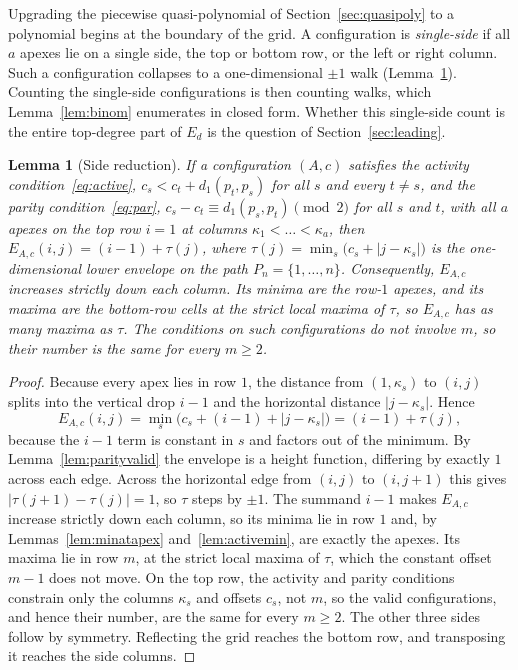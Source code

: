 \documentclass[11pt]{article}
\newtheorem{lemma}[theorem]{Lemma}
\theoremstyle{definition}
\theoremstyle{remark}
\newcommand{\dgrid}{d_1}
\begin{document}
Upgrading the piecewise quasi-polynomial of Section~\ref{sec:quasipoly} to a
polynomial begins at the boundary of the grid. A configuration is
\emph{single-side} if all $a$ apexes lie on a single side, the top or bottom
row, or the left or right column. Such a configuration collapses to a one-dimensional
$\pm1$ walk (Lemma~\ref{lem:edgered}). Counting the single-side configurations is then
counting walks, which Lemma~\ref{lem:binom} enumerates in closed form. Whether this single-side
count is the entire top-degree part of $E_d$ is the question of Section~\ref{sec:leading}.

\begin{lemma}[Side reduction]\label{lem:edgered}
If a configuration $(A,c)$ satisfies the activity condition~\eqref{eq:active},
$c_s<c_t+\dgrid(p_t,p_s)$ for all $s$ and every $t\ne s$, and the parity
condition~\eqref{eq:par}, $c_s-c_t\equiv\dgrid(p_s,p_t)\pmod 2$ for all $s$ and
$t$, with all $a$ apexes on the top row $i=1$ at columns
$\kappa_1<\dots<\kappa_a$, then
$E_{A,c}(i,j)=(i-1)+\tau(j)$, where $\tau(j)=\min_s\big(c_s+|j-\kappa_s|\big)$
is the one-dimensional lower envelope on the path $P_n=\{1,\dots,n\}$. Consequently,
$E_{A,c}$ increases strictly down each column. Its minima are the row-$1$ apexes,
and its maxima are the bottom-row cells at the strict local maxima of $\tau$, so
$E_{A,c}$ has as many maxima as $\tau$. The conditions on such configurations do
not involve $m$, so their number is the same for every $m\ge2$.
\end{lemma}

\begin{proof}
Because every apex lies in row $1$, the distance from $(1,\kappa_s)$ to $(i,j)$
splits into the vertical drop $i-1$ and the horizontal distance $|j-\kappa_s|$. Hence
\[
  E_{A,c}(i,j)=\min_s\big(c_s+(i-1)+|j-\kappa_s|\big)=(i-1)+\tau(j),
\]
because the $i-1$ term is constant in $s$ and factors out of the minimum. By Lemma~\ref{lem:parityvalid} the envelope is a
height function, differing by exactly $1$ across each edge. Across the horizontal
edge from $(i,j)$ to $(i,j+1)$ this gives $|\tau(j+1)-\tau(j)|=1$, so $\tau$ steps
by $\pm1$. The summand $i-1$ makes $E_{A,c}$ increase strictly down each column, so its
minima lie in row $1$ and, by Lemmas~\ref{lem:minatapex} and~\ref{lem:activemin},
are exactly the apexes. Its maxima lie in row $m$, at the strict local maxima
of $\tau$, which the constant offset $m-1$ does not move. On the top row,
the activity and parity conditions constrain only the columns $\kappa_s$ and
offsets $c_s$, not $m$, so the valid configurations, and hence their number, are
the same for every $m\ge2$. The
other three sides follow by symmetry. Reflecting the grid reaches the bottom row,
and transposing it reaches the side columns.
\end{proof}
\end{document}
